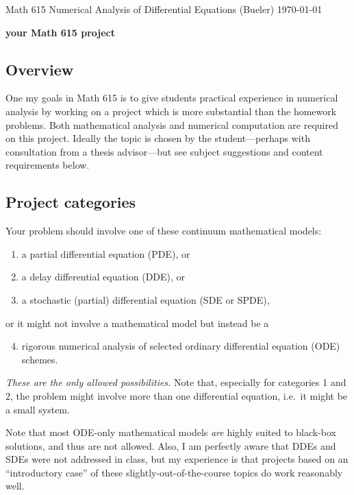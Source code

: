 \documentclass[11pt]{amsart}
\begin{document}
\scriptsize \noindent Math 615 Numerical Analysis of Differential Equations (Bueler) \hfill \today
\bigskip

\Large\centerline{\textbf{your Math 615 project}}
\normalsize

\thispagestyle{empty}

\bigskip

\subsection*{Overview}  One my goals in Math 615 is to give students practical experience in numerical analysis by working on a project which is more substantial than the homework problems.  Both mathematical analysis and numerical computation are required on this project.  Ideally the topic is chosen by the student---perhaps with consultation from a thesis advisor---but see subject suggestions and content requirements below.

\subsection*{Project categories}  Your problem should involve one of these continuum mathematical models:
\renewcommand{\labelenumi}{\arabic{enumi}.}
\begin{enumerate}
\item a partial differential equation (PDE), or
\item a delay differential equation (DDE), or
\item a stochastic (partial) differential equation (SDE or SPDE),
\end{enumerate}
or it might not involve a mathematical model but instead be a
\begin{enumerate}
\setcounter{enumi}{3}
\item rigorous numerical analysis of selected ordinary differential equation (ODE) schemes.
\end{enumerate}
\emph{These are the only allowed possibilities.}  Note that, especially for categories 1 and 2, the problem might involve more than one differential equation, i.e.~it might be a small system.

Note that most ODE-only mathematical models \emph{are} highly suited to black-box solutions, and thus are not allowed.  Also, I am perfectly aware that DDEs and SDEs were not addressed in class, but my experience is that projects based on an ``introductory case'' of these slightly-out-of-the-course topics do work reasonably well.
\end{document}
